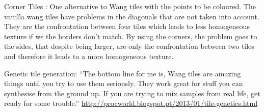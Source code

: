 Corner Tiles \cite{LD06AWTCECC}:
One alternative to Wang tiles with the points to be coloured.
The vanilla wang tiles have problems in the diagonals that are not taken into account. They are the confrontation between four tiles which leads to less homogeneous texture if we the borders don't match. By using the corners, the problem goes to the sides, that despite being larger, are only the confrontation between two tiles and therefore it leads to a more homogeneous texture.

Genetic tile generation:
“The bottom line for me is, Wang tiles are amazing things until you try to use them seriously. They work great for stuff you can synthesise from the ground up. If you are trying to mix samples from real life, get ready for some trouble.”
\url{http://procworld.blogspot.pt/2013/01/tile-genetics.html}


